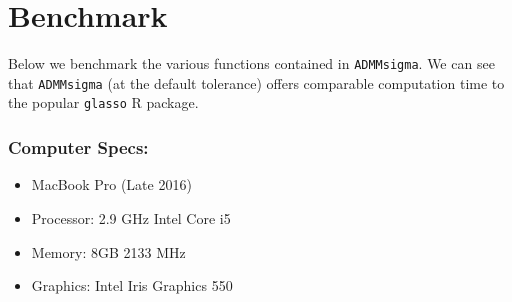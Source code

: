 \documentclass[12pt,]{book}
\providecommand{\tightlist}{%
  \setlength{\itemsep}{0pt}\setlength{\parskip}{0pt}}
\theoremstyle{definition}
\theoremstyle{definition}
\theoremstyle{definition}
\theoremstyle{remark}
\begin{document}
\hypertarget{benchmark}{%
\chapter{Benchmark}\label{benchmark}}

Below we benchmark the various functions contained in
\texttt{ADMMsigma}. We can see that \texttt{ADMMsigma} (at the default
tolerance) offers comparable computation time to the popular
\texttt{glasso} R package.

\hypertarget{computer-specs}{%
\subsection{Computer Specs:}\label{computer-specs}}

\begin{itemize}
\tightlist
\item
  MacBook Pro (Late 2016)
\item
  Processor: 2.9 GHz Intel Core i5
\item
  Memory: 8GB 2133 MHz
\item
  Graphics: Intel Iris Graphics 550
\end{itemize}

\vspace{0.5cm}
\end{document}
